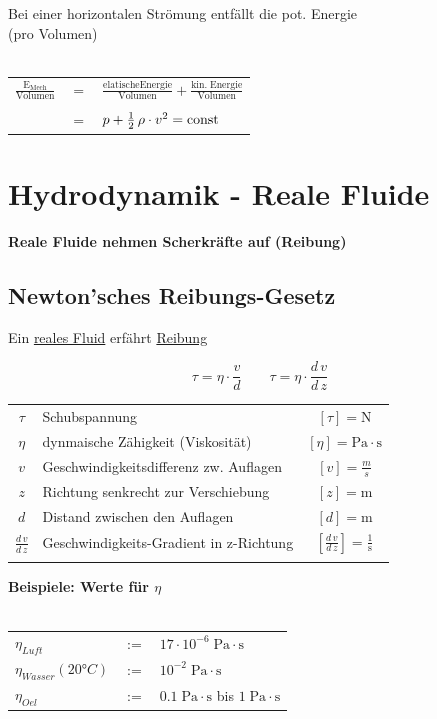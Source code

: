 Bei einer horizontalen Strömung entfällt die pot. Energie\\
(pro Volumen) \\
\\

\begin{tabular}{l c l}
$ \mathrm{ \frac{E_{Mech}}{Volumen}}$ & $=$ & $\mathrm{ \frac{elatische Energie}{Volumen} + \frac{kin. \; Energie}{Volumen} }$ \\
\\
& $=$ & $ p + \frac{1}{2} \, \rho \cdot v^2 = \mathrm{const}$ \\
\end{tabular}





\section{Hydrodynamik - Reale Fluide}

\textbf{Reale Fluide nehmen Scherkräfte auf (Reibung)}


\subsection{Newton'sches Reibungs-Gesetz}
Ein \underline{reales Fluid} erfährt \underline{Reibung} 

$$ \boxed{ \tau = \eta \cdot \frac{v}{d} }  \qquad  \boxed{ \tau = \eta \cdot \frac{d \, v}{d \, z} } $$

\begin{tabular}{c l c}
		$\tau$ & Schubspannung & $[\tau] = \mathrm{N}$ \\
		$\eta$ & dynmaische Zähigkeit (Viskosität) & $[\eta] = \mathrm{Pa \cdot s}$ \\
		\rule{0pt}{8pt}$v$ & Geschwindigkeitsdifferenz zw. Auflagen & $[v] = \frac{m}{s}$ \\
		$z$ & Richtung senkrecht zur Verschiebung & $[z] = \mathrm{m}$ \\
		$d$ & Distand zwischen den Auflagen & $[d] = \mathrm{m}$ \\
		\rule{0pt}{8pt}$\frac{d \, v}{d \, z}$ & Geschwindigkeits-Gradient in z-Richtung & $[\frac{d \, v}{d \, z}] = \mathrm{\frac{1}{s}}$ \\
		\\
\end{tabular}
	
\textbf{Beispiele: Werte für $\eta$} \\ %
\\
\begin{tabular}{l c l}
		$\eta_{Luft}$ & $:=$ & $17 \cdot 10^{-6} \; \mathrm{Pa \cdot s} $ \\
		$\eta_{Wasser} (20°C)$ & $:=$ & $10^{-2} \; \mathrm{Pa \cdot s}$ \\
		$\eta_{Oel}$ & $:=$ & $0.1 \; \mathrm{Pa \cdot s}$ bis $1 \; \mathrm{Pa \cdot s}$ \\
\end{tabular}



